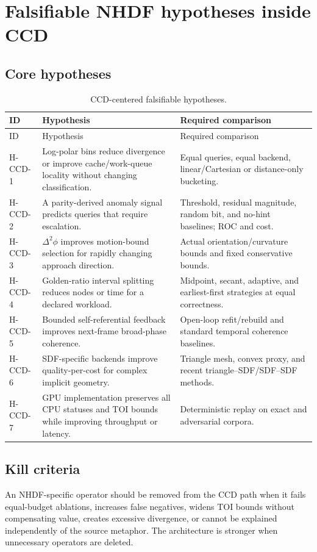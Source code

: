 \documentclass[11pt,a4paper,openany]{book}
\begin{document}
\chapter{Falsifiable NHDF hypotheses inside CCD}
\section{Core hypotheses}
\begin{longtable}{@{}L{0.10\textwidth}L{0.48\textwidth}L{0.32\textwidth}@{}}
\caption{CCD-centered falsifiable hypotheses.}\label{tab:hypotheses}\\
\toprule ID & Hypothesis & Required comparison \\ \midrule
\endfirsthead
\toprule ID & Hypothesis & Required comparison \\ \midrule
\endhead
H-CCD-1 & Log-polar bins reduce divergence or improve cache/work-queue locality without changing classification. & Equal queries, equal backend, linear/Cartesian or distance-only bucketing. \\
H-CCD-2 & A parity-derived anomaly signal predicts queries that require escalation. & Threshold, residual magnitude, random bit, and no-hint baselines; ROC and cost. \\
H-CCD-3 & $\Delta^2\phi$ improves motion-bound selection for rapidly changing approach direction. & Actual orientation/curvature bounds and fixed conservative bounds. \\
H-CCD-4 & Golden-ratio interval splitting reduces nodes or time for a declared workload. & Midpoint, secant, adaptive, and earliest-first strategies at equal correctness. \\
H-CCD-5 & Bounded self-referential feedback improves next-frame broad-phase coherence. & Open-loop refit/rebuild and standard temporal coherence baselines. \\
H-CCD-6 & SDF-specific backends improve quality-per-cost for complex implicit geometry. & Triangle mesh, convex proxy, and recent triangle--SDF/SDF--SDF methods. \\
H-CCD-7 & GPU implementation preserves all CPU statuses and TOI bounds while improving throughput or latency. & Deterministic replay on exact and adversarial corpora. \\
\bottomrule
\end{longtable}

\section{Kill criteria}
An NHDF-specific operator should be removed from the CCD path when it fails equal-budget ablations, increases false negatives, widens TOI bounds without compensating value, creates excessive divergence, or cannot be explained independently of the source metaphor. The architecture is stronger when unnecessary operators are deleted.
\end{document}
